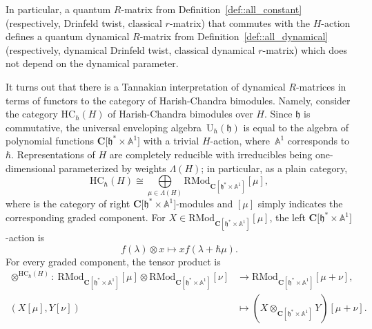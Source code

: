 \documentclass[10pt,a4paper]{amsart}
\numberwithin{equation}{section}
\newcommand{\C}{\mathbf{C}}
\newcommand{\U}{\mathrm{U}_{\hbar}}
\newcommand{\h}{\mathfrak{h}}
\newcommand{\HC}{\mathrm{HC}_{\hbar}}
\newcommand{\RMod}{\mathrm{RMod}}
\begin{document}
	\begin{Remark}
		In particular, a quantum $R$-matrix from Definition~\ref{def::all_constant} (respectively, Drinfeld twist, classical $r$-matrix) that commutes with the $H$-action defines a quantum dynamical $R$-matrix from Definition~\ref{def::all_dynamical} (respectively, dynamical Drinfeld twist, classical dynamical $r$-matrix) which does not depend on the dynamical parameter.
	\end{Remark}
	
	It turns out that there is a Tannakian interpretation of dynamical $R$-matrices in terms of functors to the category of Harish-Chandra bimodules. Namely, consider the category $\HC(H)$ of Harish-Chandra bimodules over $H$. Since $\h$ is commutative, the universal enveloping algebra~$\U(\h)$ is equal to the algebra of polynomial functions $\C\bigl[\h^* \times \mathbb{A}^1\bigr]$ with a trivial $H$-action, where~$\mathbb{A}^1$ corresponds to $\hbar$. Representations of $H$ are completely reducible with irreducibles being one-dimensional parameterized by weights $\Lambda(H)$; in particular, as a plain category,
	\[
	\HC(H) \cong \bigoplus\limits_{\mu \in \Lambda(H)} \RMod_{\C[\h^* \times \mathbb{A}^1]}[\mu],
	\]
	where \smash{$\RMod_{\C[\h \times \mathbb{A}^1]}$} is the category of right $\C\bigl[\h^* \times \mathbb{A}^1\bigr]$-modules and $[\mu]$ simply indicates the corresponding graded component. For $X\in \RMod_{\C[\h^* \times \mathbb{A}^1]}[\mu]$, the left $\C\bigl[\h^* \times \mathbb{A}^1\bigr]$-action is
	\begin{equation}
		\label{eq::hc_left_action}
		f(\lambda) \otimes x \mapsto x f(\lambda+\hbar \mu).
	\end{equation}
	For every graded component, the tensor product is
	\begin{align}
			\otimes^{\HC(H)}\colon\ \RMod_{\C[\h^* \times \mathbb{A}^1]} [\mu] \otimes \RMod_{\C[\h^* \times \mathbb{A}^1]} [\nu] & \rightarrow \RMod_{\C[\h^* \times \mathbb{A}^1]} [\mu+\nu],\nonumber \\
(X[\mu],Y[\nu]) & \mapsto (X \otimes_{\C[\h^* \times \mathbb{A}^1]} Y)[\mu+\nu].\label{eq::hc_h_tensor_product}
	\end{align}
	
\end{document}

